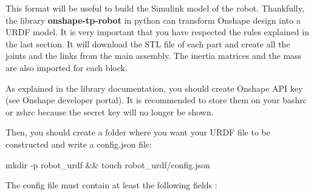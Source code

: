 \bigbreak
This format will be useful to build the Simulink model of the robot. Thankfully, the library \textbf{onshape-tp-robot} in python can transform Onshape design into a URDF model. It is very important that you have respected the rules explained in the last section. It will download the STL file of each part and create all the joints and the links from the main assembly. The inertia matrices and the mass are also imported for each block. 

\bigbreak
As explained in the library documentation, you should create Onshape API key (see Onshape developer portal). It is recommended to store them on your bashrc or zshrc because the secret key will no longer be shown.

\bigbreak
\begin{center}
    \begin{minipage}{10cm}
    \end{minipage}
\end{center}

\bigbreak
Then, you should create a folder where you want your URDF file to be constructed and write a config.json file:
\begin{commandshell}
    mkdir -p robot\_urdf && touch robot\_urdf/config.json
\end{commandshell} 

\bigbreak
The config file must contain at least the following fields :
\begin{center}
    \begin{minipage}{8cm}
    \end{minipage}
\end{center}

